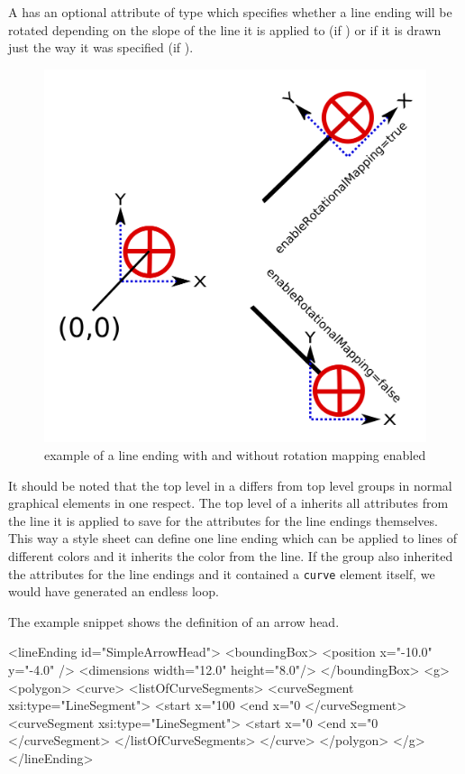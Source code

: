 A \LineEnding has an optional attribute 
of type  which specifies whether a line ending
will be rotated depending on the slope of the line it is applied to (if ) or if it is
drawn just the way it was specified (if ).
\begin{figure}[h!]
\begin{center}
\includegraphics[scale=0.15]{figures/EnableRotationalMapping.png}
\end{center}
\caption{example of a line ending with and without rotation mapping enabled}
\label{EnableRotationalMapping}
\end{figure}

It should be noted that the top level \RenderGroup in a \LineEnding differs from top level groups in normal graphical elements in one respect. The top level \RenderGroup of a \LineEnding inherits all attributes from the line it is applied to save for the attributes for the line endings themselves. This way a style sheet can define one line ending which can be applied to lines of different colors and it inherits the color from the line.
If the group also inherited the attributes for the line endings and it contained a \texttt{curve} element itself, we would have generated an endless loop.

The example snippet shows the definition of an arrow head.

{
\footnotesize
\begin{example}
<lineEnding id="SimpleArrowHead">
 <boundingBox>
   <position x="-10.0" y="-4.0" />
   <dimensions width="12.0" height="8.0"/>
 </boundingBox>
 <g>
   <polygon>
     <curve>
       <listOfCurveSegments>
         <curveSegment xsi:type="LineSegment">
           <start x="100%
           <end x="0%
         </curveSegment>
         <curveSegment xsi:type="LineSegment">
           <start x="0%
           <end x="0%
         </curveSegment>
       </listOfCurveSegments>
     </curve>
   </polygon>
 </g>
</lineEnding>  
\end{example}
}


